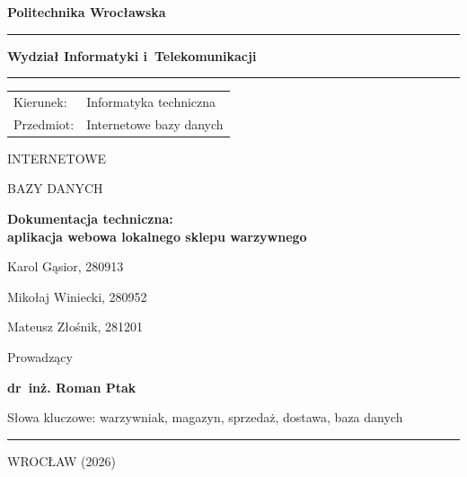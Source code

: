 
\newcommand{\tytulpl}{Dokumentacja techniczna:\\[0.35em]
	aplikacja webowa lokalnego sklepu warzywnego}

\clearpage
\thispagestyle{empty}
\begingroup
	\centering
	{\Large\bfseries Politechnika Wrocławska\par}
	\vspace{0.55em}
	\rule{\textwidth}{1.05pt}\par
	\vspace{0.7em}
	{\large\bfseries Wydział Informatyki i~Telekomunikacji\par}
	\vspace{0.45em}
	\rule{\textwidth}{0.55pt}\par

	\vspace{1.35cm}
	\begin{flushleft}
		\begin{tabular}{@{}p{3.1cm}l@{}}
			Kierunek:  & Informatyka techniczna \\[0.45em]
			Przedmiot: & Internetowe bazy danych \\
		\end{tabular}
	\end{flushleft}

	\vspace{1.9cm}
	{\LARGE INTERNETOWE\par}
	\vspace{0.15em}
	{\LARGE BAZY DANYCH\par}

	\vspace{1.7cm}
	{\Large\bfseries \tytulpl\par}

	\vspace{1.45cm}
	Karol Gąsior, 280913\par
	\vspace{0.2em}
	Mikołaj Winiecki, 280952\par
	\vspace{0.2em}
	Mateusz Złośnik, 281201\par

	\vspace{1.45cm}
	Prowadzący\par
	\vspace{0.25em}
	\textbf{dr~inż. Roman Ptak}\par

	\vfill
	\begin{flushleft}
		Słowa kluczowe: warzywniak, magazyn, sprzedaż, dostawa, baza danych
	\end{flushleft}
	\vspace{0.55cm}
	\rule{\textwidth}{0.7pt}\par
	\vspace{0.55em}
	WROCŁAW (2026)\par
	\vspace*{0.2cm}
\endgroup
\clearpage
